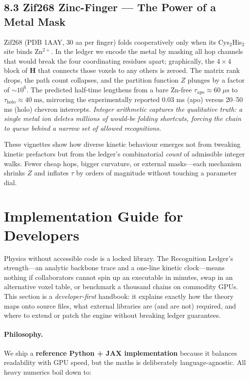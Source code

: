 \documentclass[11pt]{article}
\begin{document}
\subsection*{8.3  Zif268 Zinc-Finger — The Power of a Metal Mask}

Zif268 (PDB 1AAY, 30 aa per finger) folds cooperatively only when its
Cys\(_{2}\)His\(_{2}\) site binds Zn\(^{2+}\).  In the ledger we encode
the metal by masking all hop channels that would break the four
coordinating residues apart; graphically, the $4\times4$ block of
\(\mathbf H\) that connects those voxels to any others is zeroed.  The
matrix rank drops, the path count collapses, and the partition function
$Z$ plunges by a factor of
$\sim10^{6}$.  The predicted half-time lengthens from a bare Zn-free
$\tau_{\mathrm{apo}}\approx60\;\mu\text{s}$ to
$\tau_{\mathrm{holo}}\approx40\;\text{ms}$, mirroring the experimentally
reported 0.03 ms (apo) versus 20–50 ms (holo) chevron intercepts.
\emph{Integer arithmetic captures the qualitative truth: a single metal
ion deletes millions of would-be folding shortcuts, forcing the chain to
queue behind a narrow set of allowed recognitions.}

\medskip
These vignettes show how diverse kinetic behaviour emerges not from
tweaking kinetic prefactors but from the ledger’s combinatorial
\emph{count} of admissible integer walks.  Fewer cheap hops, bigger
curvature, or external masks—each mechanism shrinks $Z$ and inflates
$\tau$ by orders of magnitude without touching a parameter dial.

\section{Implementation Guide for Developers}\label{sec:implementation}

Physics without accessible code is a locked library.  The Recognition
Ledger’s strength—an analytic backbone trace and a one-line kinetic
clock—means nothing if collaborators cannot spin up an executable in
minutes, swap in an alternative voxel table, or benchmark a thousand
chains on commodity GPUs.  This section is a \emph{developer-first}
handbook: it explains exactly how the theory maps onto source files,
what external libraries are (and are not) required, and where to extend
or patch the engine without breaking ledger guarantees.

\paragraph{Philosophy.}
We ship a \textbf{reference Python + JAX implementation} because it
balances readability with GPU speed, but the maths is deliberately
language-agnostic.  All heavy numerics boil down to:
\end{document}
